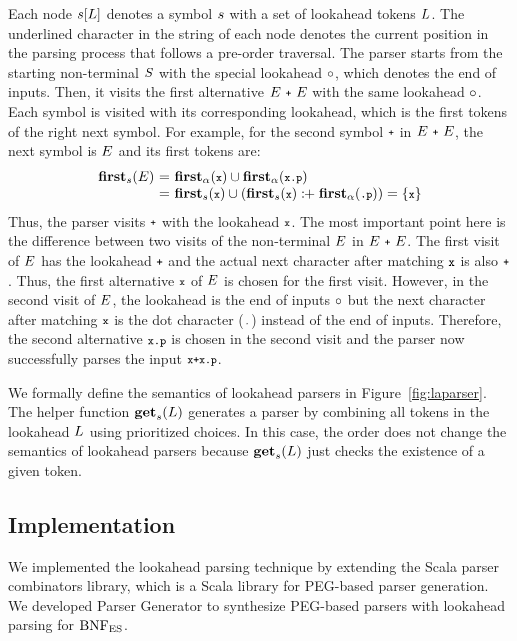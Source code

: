 \smallskip
\noindent
Each node \( s[L] \) denotes a symbol \( s \) with a set of lookahead
tokens \( L \).  The underlined character in the string of each node denotes
the current position in the parsing process that follows a pre-order traversal.
The parser starts from the starting non-terminal \( S \) with the special lookahead \(
\circ \), which denotes the end of inputs.  Then, it visits the first
alternative \( E~\texttt{\footnotesize+}~E \) with the same lookahead \( \circ \).
Each symbol is visited with its corresponding lookahead, which is the first
tokens of the right next symbol.  For example, for the second symbol \( \texttt{\footnotesize+} \)
in \( E~\texttt{\footnotesize+}~E \), the next symbol is \( E \) and its first
tokens are:
\[
  \begin{array}{r@{~}c@{~}l}
    \symbfirst{\NT{E}} &=& \rhsfirst{\T{x}} \cup \rhsfirst{\T{x.p}}\\
                       &=& \symbfirst{\T{x}} \cup (\symbfirst{\T{x}} \firstplus
    \rhsfirst{\T{.p}}) = \{ \T{x} \}\\
  \end{array}
\]
Thus, the parser visits \( \texttt{\footnotesize+} \) with the lookahead \( \texttt{\footnotesize x} \).
The most important point here is the difference between two visits of the
non-terminal \( E \) in \( E~\texttt{\footnotesize+}~E \).  The first visit of \(
E \) has the lookahead \( \texttt{\footnotesize+} \) and the actual next character after
matching \( \texttt{\footnotesize x} \) is also \( \texttt{\footnotesize+} \). Thus, the first alternative \( \texttt{\footnotesize x}
\) of \( E \) is chosen for the first visit.  However, in the second visit
of \( E \), the lookahead is the end of inputs \( \circ \) but the
next character after matching \( \texttt{\footnotesize x} \) is the dot character (\( \texttt{\footnotesize.} \))
instead of the end of inputs.  Therefore, the second alternative \( \texttt{\footnotesize x.p} \) is
chosen in the second visit and the parser now successfully parses the input \(
\texttt{\footnotesize x+x.p} \).

We formally define the semantics of lookahead parsers in Figure~\ref{fig:laparser}.
The helper function \( \textbf{get}_s(L) \) generates a parser by combining all
tokens in the lookahead \( L \) using prioritized choices.
In this case, the order does not change the semantics of lookahead parsers
because \( \textbf{get}_s(L) \) just checks the existence of a given token.

\subsection{Implementation}\label{sec:convert-bnfes}
We implemented the lookahead parsing technique
by extending the Scala parser combinators
library, which is a Scala library for PEG-based parser generation.  We
developed {\sf Parser Generator} to synthesize PEG-based parsers with
lookahead parsing for \( \text{BNF}_{\text{ES}} \).

